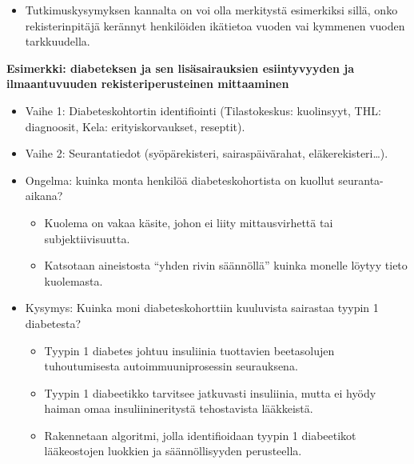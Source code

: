 \documentclass[
]{book}
\providecommand{\tightlist}{%
  \setlength{\itemsep}{0pt}\setlength{\parskip}{0pt}}
\begin{document}
\begin{itemize}
\begin{itemize}
    \begin{itemize}
    \tightlist
    \item
      Tutkimuskysymyksen kannalta on voi olla merkitystä esimerkiksi sillä, onko rekisterinpitäjä kerännyt henkilöiden ikätietoa vuoden vai kymmenen vuoden tarkkuudella.
    \end{itemize}
  \end{itemize}
\end{itemize}

\FloatBarrier

\begin{eblock}{}

\textbf{Esimerkki: diabeteksen ja sen lisäsairauksien esiintyvyyden ja ilmaantuvuuden rekisteriperusteinen mittaaminen}

\begin{itemize}
\item
  Vaihe 1: Diabeteskohtortin identifiointi (Tilastokeskus: kuolinsyyt, THL: diagnoosit, Kela: erityiskorvaukset, reseptit).
\item
  Vaihe 2: Seurantatiedot (syöpärekisteri, sairaspäivärahat, eläkerekisteri\ldots).
\item
  Ongelma: kuinka monta henkilöä diabeteskohortista on kuollut seuranta-aikana?

  \begin{itemize}
  \tightlist
  \item
    Kuolema on vakaa käsite, johon ei liity mittausvirhettä tai subjektiivisuutta.
  \item
    Katsotaan aineistosta ``yhden rivin säännöllä'' kuinka monelle löytyy tieto kuolemasta.
  \end{itemize}
\item
  Kysymys: Kuinka moni diabeteskohorttiin kuuluvista sairastaa tyypin 1 diabetesta?

  \begin{itemize}
  \tightlist
  \item
    Tyypin 1 diabetes johtuu insuliinia tuottavien beetasolujen tuhoutumisesta autoimmuuniprosessin seurauksena.
  \item
    Tyypin 1 diabeetikko tarvitsee jatkuvasti insuliinia, mutta ei hyödy haiman omaa insuliinineritystä tehostavista lääkkeistä.
  \item
    Rakennetaan algoritmi, jolla identifioidaan tyypin 1 diabeetikot lääkeostojen luokkien ja säännöllisyyden perusteella.
  \end{itemize}
\end{itemize}

\end{eblock}
\end{document}
